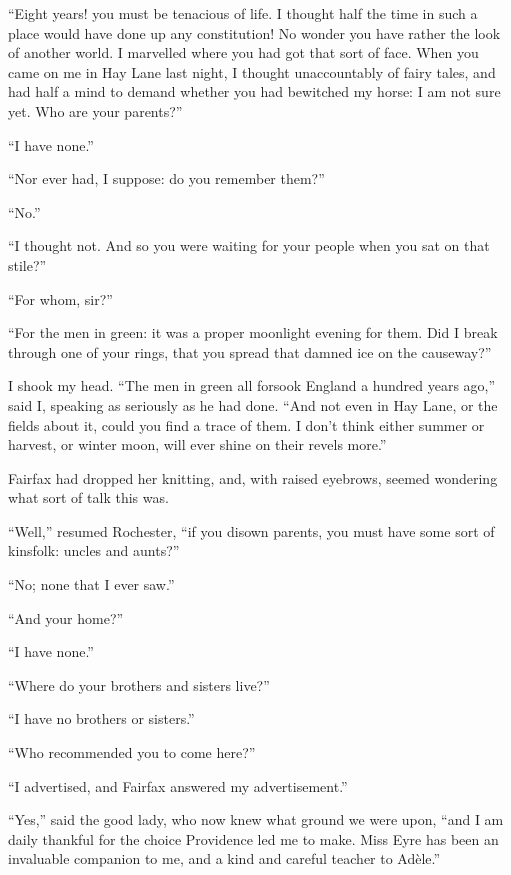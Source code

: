 \enquote{Eight years! you must be tenacious of life. I thought half the
time in such a place would have done up any constitution! No wonder you
have rather the look of another world. I marvelled where you had got
that sort of face. When you came on me in Hay Lane last night, I
thought unaccountably of fairy tales, and had half a mind to demand
whether you had bewitched my horse: I am not sure yet. Who are your
parents?}

\enquote{I have none.}

\enquote{Nor ever had, I suppose: do you remember them?}

\enquote{No.}

\enquote{I thought not. And so you were waiting for your people when
you sat on that stile?}

\enquote{For whom, sir?}

\enquote{For the men in green: it was a proper moonlight evening for
them. Did I break through one of your rings, that you spread that
damned ice on the causeway?}

I shook my head. \enquote{The men in green all forsook England a
hundred years ago,} said I, speaking as seriously as he had done. 
\enquote{And not even in Hay Lane, or the fields about it, could you
find a trace of them. I don't think either summer or harvest, or winter
moon, will ever shine on their revels more.}

\Mrs{} Fairfax had dropped her knitting, and, with raised eyebrows, seemed
wondering what sort of talk this was.

\enquote{Well,} resumed \Mr{} Rochester, \enquote{if you disown parents,
you must have some sort of kinsfolk: uncles and aunts?}

\enquote{No; none that I ever saw.}

\enquote{And your home?}

\enquote{I have none.}

\enquote{Where do your brothers and sisters live?}

\enquote{I have no brothers or sisters.}

\enquote{Who recommended you to come here?}

\enquote{I advertised, and \Mrs{} Fairfax answered my advertisement.}

\enquote{Yes,} said the good lady, who now knew what ground we were
upon, \enquote{and I am daily thankful for the choice Providence led me
to make. Miss Eyre has been an invaluable companion to me, and a kind
and careful teacher to Adèle.}

